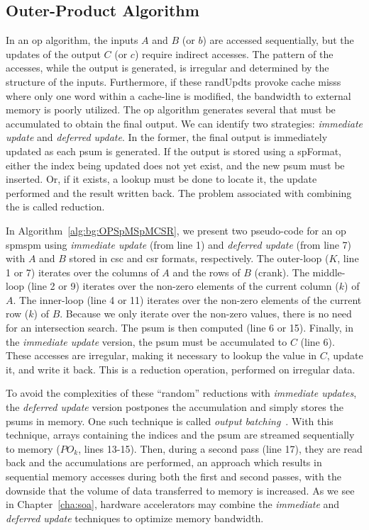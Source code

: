 \subsection{Outer-Product Algorithm}

In an \acrshort{op} algorithm, the inputs $A$ and $B$ (or $b$) are accessed sequentially, but the updates of the output $C$ (or $c$) require indirect accesses.
The pattern of the accesses, while the output is generated, is irregular and determined by the structure of the inputs.
Furthermore, if these \glspl{randUpdt} provoke cache \glspl{miss} where only one word within a cache-line is modified, the bandwidth to external memory is poorly utilized.
The \acrshort{op} algorithm generates several  that must be accumulated to obtain the final output.
We can identify two strategies: \emph{immediate update} and \emph{deferred update}.
In the former, the final output is immediately updated as each \gls{psum} is generated.
If the output is stored using a \gls{spFormat}, either the index being updated does not yet exist, and the new \gls{psum} must be inserted.
Or, if it exists, a lookup must be done to locate it, the update performed and the result written back.
The problem associated with combining the  is called \gls{reduction}.

In Algorithm~\ref{alg:bg:OPSpMSpMCSR}, we present two pseudo-code for an \acrfull{op} \acrshort{spmspm} using \emph{immediate update} (from line 1) and \emph{deferred update} (from line 7) with $A$ and $B$ stored in \acrshort{csc} and \acrshort{csr} formats, respectively.
The outer-loop ($K$, line 1 or 7) iterates over the columns of $A$ and the rows of $B$ (\gls{crank}).
The middle-loop (line 2 or 9) iterates over the non-zero elements of the current column ($k$) of $A$.
The inner-loop (line 4 or 11) iterates over the non-zero elements of the current row ($k$) of $B$.
Because we only iterate over the non-zero values, there is no need for an \gls{intersection} search.
The \gls{psum} is then computed (line 6 or 15).
Finally, in the \emph{immediate update} version, the \gls{psum} must be accumulated to $C$ (line 6).
These accesses are irregular, making it necessary to lookup the value in $C$, update it, and write it back.
This is a \gls{reduction} operation, performed on irregular data.

To avoid the complexities of these ``random'' \glspl{reduction} with \emph{immediate updates}, the \emph{deferred update} version postpones the accumulation and simply stores the \glspl{psum} in memory.
One such technique is called \emph{output batching}~\cite{Kiriansky2016_Milk}.
With this technique, arrays containing the indices and the \gls{psum} are streamed sequentially to memory ($\mathit{PO}_k$, lines 13-15).
Then, during a second pass (line 17), they are read back and the accumulations are performed, an approach which results in sequential memory accesses during both the first and second passes, with the downside that the volume of data transferred to memory is increased.
As we see in Chapter~\ref{cha:soa}, hardware accelerators may combine the \emph{immediate} and \emph{deferred update} techniques to optimize memory bandwidth.

